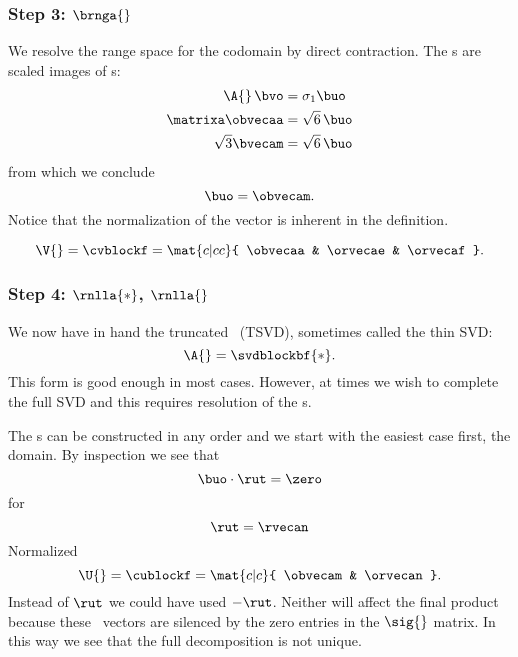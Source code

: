 \subsubsection{Step 3: $\brnga{}$}
We resolve the range space for the codomain by direct contraction. The \mv s are scaled images of \nv s:
\begin{equation}
  \begin{split}
    \A{}\,\bvo        &= \sigma_{1} \buo \\
    \matrixa \obvecaa &= \sqrt{6}\,\buo \\
    \sqrt{3} \bvecam  &= \sqrt{6}\,\buo 
  \end{split}
\end{equation}
from which we conclude
\begin{equation}
  \buo = \obvecam.
\end{equation}
Notice that the normalization of the vector is inherent in the definition.

\begin{equation}
  \V{}= \cvblockf = \mat{c|cc}{ \obvecaa & \orvecae & \orvecaf}.
\end{equation}


\subsubsection{Step 4: $\rnlla{*}$, $\rnlla{}$}
We now have in hand the truncated \asvd \ (TSVD), sometimes called the thin SVD:
\begin{equation}
  \A{} = \svdblockbf{*}.
\end{equation}
This form is good enough in most cases. However, at times we wish to complete the full SVD and this requires resolution of the \ns s.

The \ns s can be constructed in any order and we start with the easiest case first, the domain. By inspection we see that
\begin{equation}
  \buo \cdot \rut = \zero
\end{equation}
for
\begin{equation}
  \rut = \rvecan
\end{equation}
Normalized
\begin{equation}
  \U{} = \cublockf = \mat{c|c}{ \obvecam & \orvecan }.
\end{equation}
Instead of $\rut$ we could have used $-\rut$. Neither will affect the final product because these \ns \ vectors are silenced by the zero entries in the $\sig{}$ matrix. In this way we see that the full decomposition is not unique.

